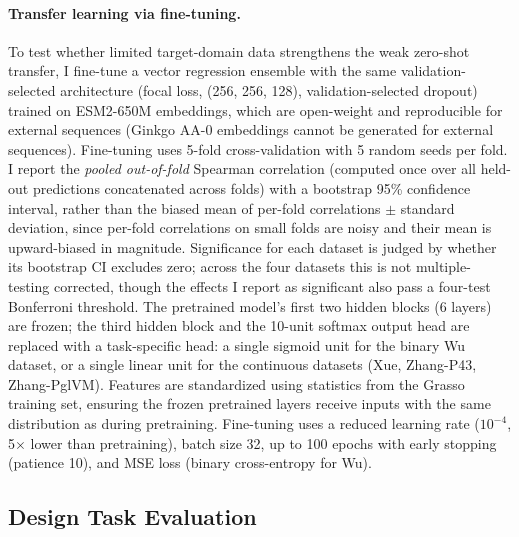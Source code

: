 \documentclass[12pt]{article}
\begin{document}
\paragraph{Transfer learning via fine-tuning.}
To test whether limited target-domain data strengthens the weak zero-shot transfer,
I fine-tune a vector regression ensemble with the same validation-selected architecture
(focal loss, (256, 256, 128), validation-selected dropout) trained on ESM2-650M embeddings,
which are open-weight and reproducible for external sequences (Ginkgo AA-0 embeddings cannot be generated for external sequences).
Fine-tuning uses 5-fold cross-validation with 5 random seeds per fold.
I report the \emph{pooled out-of-fold} Spearman correlation (computed once over all held-out predictions concatenated across folds) with a bootstrap 95\% confidence interval, rather than the biased mean of per-fold correlations $\pm$ standard deviation, since per-fold correlations on small folds are noisy and their mean is upward-biased in magnitude.
Significance for each dataset is judged by whether its bootstrap CI excludes zero; across the four datasets this is not multiple-testing corrected, though the effects I report as significant also pass a four-test Bonferroni threshold.
The pretrained model's first two hidden blocks (6 layers) are frozen; the third hidden block and the 10-unit softmax
output head are replaced with a task-specific head: a single sigmoid unit for the binary Wu dataset,
or a single linear unit for the continuous datasets (Xue, Zhang-P43, Zhang-PglVM).
Features are standardized using statistics from the Grasso training set, ensuring the frozen pretrained layers receive inputs with the same distribution as during pretraining.
Fine-tuning uses a reduced learning rate ($10^{-4}$, 5$\times$ lower than pretraining),
batch size 32, up to 100 epochs with early stopping (patience 10), and MSE loss
(binary cross-entropy for Wu).

\subsection{Design Task Evaluation}
\label{sec:design_methods}
\end{document}

